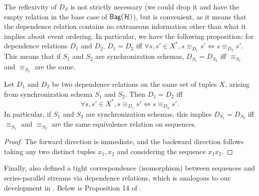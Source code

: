 The reflexivity of $D_{S}$ is not strictly necessary (we could drop it and have the empty relation in the base case of $\mathsf{Bag}({\mathcal{H}})$), but is convenient, as it means that the dependence relation contains no extraneous information other than what it implies about event ordering.
In particular,
we have the following proposition:
for dependence relations $D_1$ and $D_2$, $D_1 = D_2$ iff
$\forall s, s' \in X^{*}, s \equiv_{D_1} s' \iff s \equiv_{D_2} s'$.
This means that if $S_1$ and $S_2$ are synchronization schemas,
$D_{S_1} = D_{S_2}$ iff $\equiv_{S_1}$ and $\equiv_{S_2}$ are the same.

\begin{proposition}
\label{prop:why-reflexive}
Let $D_1$ and $D_2$ be two dependence relations on the same set of tuples $X$,
arising from synchronization schema $S_1$ and $S_2$.
Then $D_1 = D_2$ iff
\[
    \forall s, s' \in X^{*}, s \equiv_{D_1} s' \iff s \equiv_{D_2} s'.
\]
In particular, if $S_1$ and $S_2$ are synchronization schemas, this implies
$D_{S_1} = D_{S_2}$ iff $\equiv_{S_1}$ and $\equiv_{S_2}$ are the same equivalence relation on sequences.
\end{proposition}
\begin{proof}
The forward direction is immediate, and the backward direction follows
taking any two distinct tuples $x_1, x_2$ and considering the sequence $x_1 x_2$.
\end{proof}

Finally,  also defined a tight correspondence (isomorphism)
between sequences and series-parallel streams via dependence relations,
which is analogous to our development in .
Below is Proposition 14 of .

